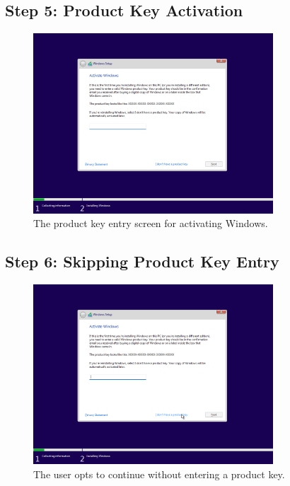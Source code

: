 \documentclass{article}
\begin{document}
\subsection{Step 5: Product Key Activation}
\begin{figure}[H]
    \centering
    \includegraphics[width=0.8\textwidth]{2024-09-17_13-50-53.png}
    \caption{The product key entry screen for activating Windows.}
\end{figure}

\subsection{Step 6: Skipping Product Key Entry}
\begin{figure}[H]
    \centering
    \includegraphics[width=0.8\textwidth]{2024-09-17_13-51-00.png}
    \caption{The user opts to continue without entering a product key.}
\end{figure}
\end{document}
